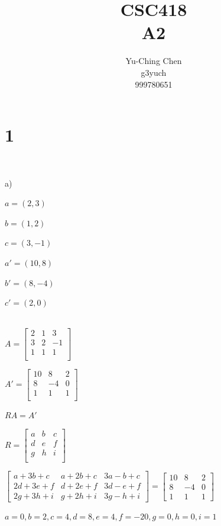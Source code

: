 \documentclass[12pt,a4paper]{article}
\author{Yu-Ching Chen\\g3yuch\\999780651}
\title{CSC418\\A2}
\begin{document}
\maketitle
\section*{1}
${}$

a)

\begin{minipage}{0.3\textwidth}
$a = (2,3)$

$b = (1,2)$

$c = (3,-1)$
\end{minipage}
\begin{minipage}{0.3\textwidth}
$a' = (10,8)$

$b' = (8,-4)$

$c' = (2,0)$
\end{minipage}
\\

$A = \begin{bmatrix}
2 & 1 & 3\\
3 & 2 & -1\\ 
1&1&1\\
\end{bmatrix}
$

$A' = \begin{bmatrix}
10 & 8 & 2\\
8 & -4 & 0\\
1&1&1\\
\end{bmatrix}
$

$RA = A'$

$R = \begin{bmatrix}
a&b&c\\
d&e&f\\
g&h&i\\
\end{bmatrix}
$

$\begin{bmatrix}
a+3 b+c & a+2 b+c & 3 a-b+c\\
2 d+3 e+f & d+2 e+f & 3 d-e+f\\
2 g+3 h+i & g+2 h+i & 3 g-h+i
\end{bmatrix} = \begin{bmatrix}
10 & 8 & 2\\
8 & -4 & 0\\
1 & 1 & 1
\end{bmatrix}$

$a = 0,   b = 2,   c = 4,   d = 8,   e = 4,   f = -20,   g = 0,   h = 0,   i = 1$
	
\end{document}
